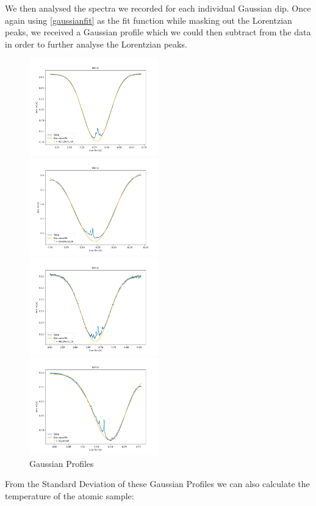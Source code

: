 \documentclass[12pt, a4paper]{article}
\begin{document}
We then analysed the spectra we recorded for each individual Gaussian dip. Once again using \autoref{gaussianfit} as the fit function while masking out the Lorentzian peaks, we received a Gaussian profile which we could then subtract from the data in order to further analyse the Lorentzian peaks.
\begin{figure} [h]
    \centering
    \parbox{0.45\textwidth}{
        \includegraphics[width=0.5\textwidth]{gaussian1.png}
    }
    \hfill
    \parbox{0.45\textwidth}{
        \includegraphics[width=0.5\textwidth]{gaussian2.png}
    }
    \parbox{0.45\textwidth}{
        \includegraphics[width=0.5\textwidth]{gaussian3.png}
    }
    \hfill
    \parbox{0.45\textwidth}{
        \includegraphics[width=0.5\textwidth]{gaussian4.png}
    }
    \caption{Gaussian Profiles}
    \label{gaussianprofiles}
\end{figure}
From the Standard Deviation of these Gaussian Profiles we can also calculate the temperature of the atomic sample:
\end{document}
